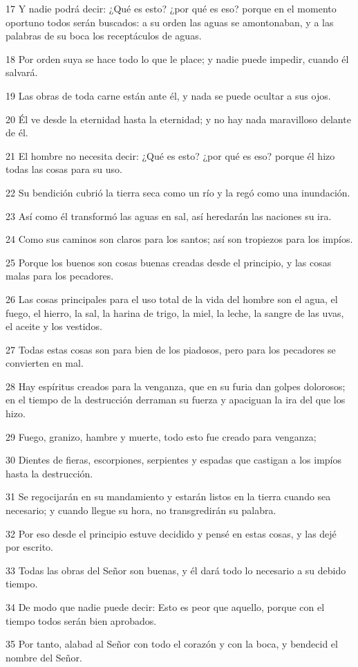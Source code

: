 \par 17 Y nadie podrá decir: ¿Qué es esto? ¿por qué es eso? porque en el momento oportuno todos serán buscados: a su orden las aguas se amontonaban, y a las palabras de su boca los receptáculos de aguas.
\par 18 Por orden suya se hace todo lo que le place; y nadie puede impedir, cuando él salvará.
\par 19 Las obras de toda carne están ante él, y nada se puede ocultar a sus ojos.
\par 20 Él ve desde la eternidad hasta la eternidad; y no hay nada maravilloso delante de él.
\par 21 El hombre no necesita decir: ¿Qué es esto? ¿por qué es eso? porque él hizo todas las cosas para su uso.
\par 22 Su bendición cubrió la tierra seca como un río y la regó como una inundación.
\par 23 Así como él transformó las aguas en sal, así heredarán las naciones su ira.
\par 24 Como sus caminos son claros para los santos; así son tropiezos para los impíos.
\par 25 Porque los buenos son cosas buenas creadas desde el principio, y las cosas malas para los pecadores.
\par 26 Las cosas principales para el uso total de la vida del hombre son el agua, el fuego, el hierro, la sal, la harina de trigo, la miel, la leche, la sangre de las uvas, el aceite y los vestidos.
\par 27 Todas estas cosas son para bien de los piadosos, pero para los pecadores se convierten en mal.
\par 28 Hay espíritus creados para la venganza, que en su furia dan golpes dolorosos; en el tiempo de la destrucción derraman su fuerza y ​​apaciguan la ira del que los hizo.
\par 29 Fuego, granizo, hambre y muerte, todo esto fue creado para venganza;
\par 30 Dientes de fieras, escorpiones, serpientes y espadas que castigan a los impíos hasta la destrucción.
\par 31 Se regocijarán en su mandamiento y estarán listos en la tierra cuando sea necesario; y cuando llegue su hora, no transgredirán su palabra.
\par 32 Por eso desde el principio estuve decidido y pensé en estas cosas, y las dejé por escrito.
\par 33 Todas las obras del Señor son buenas, y él dará todo lo necesario a su debido tiempo.
\par 34 De modo que nadie puede decir: Esto es peor que aquello, porque con el tiempo todos serán bien aprobados.
\par 35 Por tanto, alabad al Señor con todo el corazón y con la boca, y bendecid el nombre del Señor.

